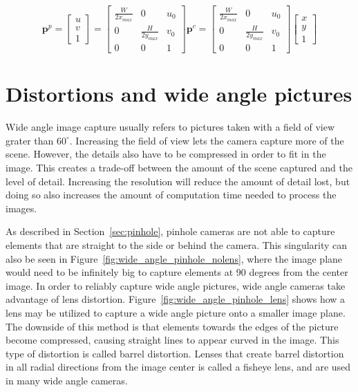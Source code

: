 \begin{equation}
    \mathbf{p}^p = \begin{bmatrix}
        u \\ v \\ 1
    \end{bmatrix} = \begin{bmatrix}
        \frac{W}{2x_{max}} & 0 & u_0 \\
        0 & \frac{H}{2y_{max}} & v_0 \\
        0 & 0 & 1
    \end{bmatrix} \mathbf{p}^c =
    \begin{bmatrix}
        \frac{W}{2x_{max}} & 0 & u_0 \\
        0 & \frac{H}{2y_{max}} & v_0 \\
        0 & 0 & 1
    \end{bmatrix}\begin{bmatrix}
        x \\ y \\ 1
    \end{bmatrix}
    \label{eq:pixel_transform}
\end{equation}

\section{Distortions and wide angle pictures}

Wide angle image capture usually refers to pictures taken with a field of view grater than $60^\circ$. Increasing the field of view lets the camera capture more of the scene. However, the details also have to be compressed in order to fit in the image. This creates a trade-off between the amount of the scene captured and the level of detail. Increasing the resolution will reduce the amount of detail lost, but doing so also increases the amount of computation time needed to process the images.

As described in Section~\ref{sec:pinhole}, pinhole cameras are not able to capture elements that are straight to the side or behind the camera. This singularity can also be seen in Figure~\ref{fig:wide_angle_pinhole_nolens}, where the image plane would need to be infinitely big to capture elements at 90 degrees from the center image. In order to reliably capture wide angle pictures, wide angle cameras take advantage of lens distortion. Figure~\ref{fig:wide_angle_pinhole_lens} shows how a lens may be utilized to capture a wide angle picture onto a smaller image plane. The downside of this method is that elements towards the edges of the picture become compressed, causing straight lines to appear curved in the image. This type of distortion is called barrel distortion. Lenses that create barrel distortion in all radial directions from the image center is called a fisheye lens, and are used in many wide angle cameras.

